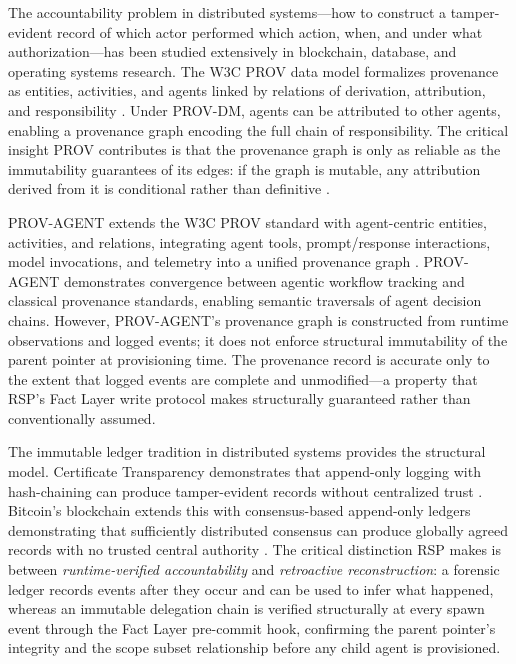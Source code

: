 The accountability problem in distributed systems---how to construct a tamper-evident record of which actor performed which action, when, and under what authorization---has been studied extensively in blockchain, database, and operating systems research. The W3C PROV data model formalizes provenance as entities, activities, and agents linked by relations of derivation, attribution, and responsibility \cite{moreau2015-prov}. Under PROV-DM, agents can be attributed to other agents, enabling a provenance graph encoding the full chain of responsibility. The critical insight PROV contributes is that the provenance graph is only as reliable as the immutability guarantees of its edges: if the graph is mutable, any attribution derived from it is conditional rather than definitive \cite{moreau2015-prov}.

PROV-AGENT extends the W3C PROV standard with agent-centric entities, activities, and relations, integrating agent tools, prompt/response interactions, model invocations, and telemetry into a unified provenance graph \cite{prov-agent2025}. PROV-AGENT demonstrates convergence between agentic workflow tracking and classical provenance standards, enabling semantic traversals of agent decision chains. However, PROV-AGENT's provenance graph is constructed from runtime observations and logged events; it does not enforce structural immutability of the parent pointer at provisioning time. The provenance record is accurate only to the extent that logged events are complete and unmodified---a property that RSP's Fact Layer write protocol makes structurally guaranteed rather than conventionally assumed.

The immutable ledger tradition in distributed systems provides the structural model. Certificate Transparency demonstrates that append-only logging with hash-chaining can produce tamper-evident records without centralized trust \cite{laurie2013certificate}. Bitcoin's blockchain extends this with consensus-based append-only ledgers demonstrating that sufficiently distributed consensus can produce globally agreed records with no trusted central authority \cite{nakamoto2008bitcoin}. The critical distinction RSP makes is between \emph{runtime-verified accountability} and \emph{retroactive reconstruction}: a forensic ledger records events after they occur and can be used to infer what happened, whereas an immutable delegation chain is verified structurally at every spawn event through the Fact Layer pre-commit hook, confirming the parent pointer's integrity and the scope subset relationship before any child agent is provisioned.

